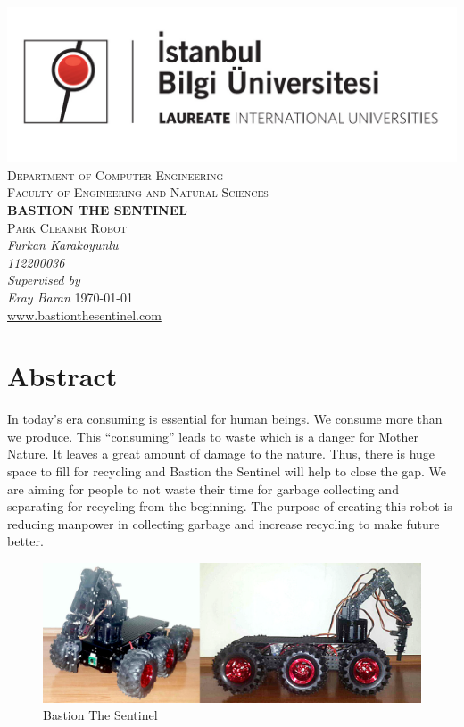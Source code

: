 \documentclass[12pt,a4paper]{article}
\begin{document}
\begin{titlepage}
 \centering
 \includegraphics[scale=0.3]{bilgi_logo}\\
 
 {\scshape\Large Department of Computer Engineering\\}
 {\scshape\Large Faculty of Engineering and Natural Sciences\\}
 \vspace{3cm}
 {\huge\bfseries BASTION THE SENTINEL\\}
 {\scshape\Large Park Cleaner Robot\\}
 \vspace{4cm}
 {\Large\itshape Furkan Karakoyunlu\\}
 {\Large\itshape 112200036\\}
 \vspace{4cm}
 {\Large\itshape Supervised by\\Eray Baran}
 \vfill
 \vfill
 {\large \today\\}
 \href{http://www.bastionthesentinel.com}{www.bastionthesentinel.com}
\end{titlepage}


\tableofcontents
\pagebreak
\listoffigures
\pagebreak

\section{Abstract}
\justify
In today’s era consuming is essential for human beings. We consume more than we produce. This “consuming” leads to 
waste which is a danger for Mother Nature. It leaves a great amount of damage to the nature. Thus, there is huge space 
to fill for recycling and Bastion the Sentinel will help to close the gap. We are aiming for people to not waste their 
time for garbage collecting and separating for recycling from the beginning. The purpose of creating this robot is 
reducing manpower in collecting garbage and increase recycling to make future better. 
\begin{figure}[h!]
  \begin{center}
    \includegraphics[scale=0.4]{bastion}
    \caption{Bastion The Sentinel}
  \end{center}
\end{figure}
\end{document}
